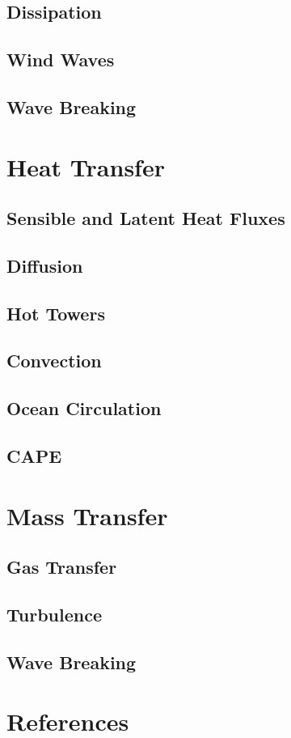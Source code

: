 \documentclass{report}
\begin{document}
    \section{Dissipation}
    \lipsum[1-2]  	

    \section{Wind Waves}
    \lipsum[1-2]

    \section{Wave Breaking}
    \lipsum[1-2]

\chapter{Heat Transfer}
    \lipsum[10]
  
    \section{Sensible and Latent Heat Fluxes}
    \lipsum[1-2]
   
    \section{Diffusion}
    \lipsum[1-2]

    \section{Hot Towers}
    \lipsum[1-2]

    \section{Convection}
    \lipsum[1-2]

    \section{Ocean Circulation}
    \lipsum[1-2]

    \section{CAPE}
    \lipsum[1-2]

\chapter{Mass Transfer}
    \lipsum[10]
  
    \section{Gas Transfer}
    \lipsum[1-2]
   
    \section{Turbulence}
    \lipsum[1-2]
  
    \section{Wave Breaking}
    \lipsum[1-2]

\chapter{References}


  
\end{document}
